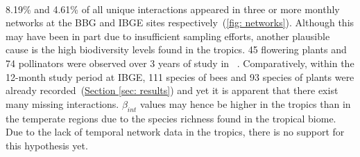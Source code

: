\documentclass[11pt]{article}
\begin{document}
\\
8.19\% and 4.61\% of all unique interactions appeared in three or more monthly networks at the BBG and IBGE sites respectively~(\autoref{fig: networks}). Although this may have been in part due to insufficient sampling efforts, another plausible cause is the high biodiversity levels found in the tropics. 45 flowering plants and 74 pollinators were observed over 3 years of study in ~\cite{CaraDonna2017}. Comparatively, within the 12-month study period at IBGE, 111 species of bees and 93 species of plants were already recorded~(\hyperref[sec: results]{Section \ref{sec: results}}) and yet it is apparent that there exist many missing interactions. $\beta_{int}$ values may hence be higher in the tropics than in the temperate regions due to the species richness found in the tropical biome. Due to the lack of temporal network data in the tropics, there is no support for this hypothesis yet.
\end{document}
